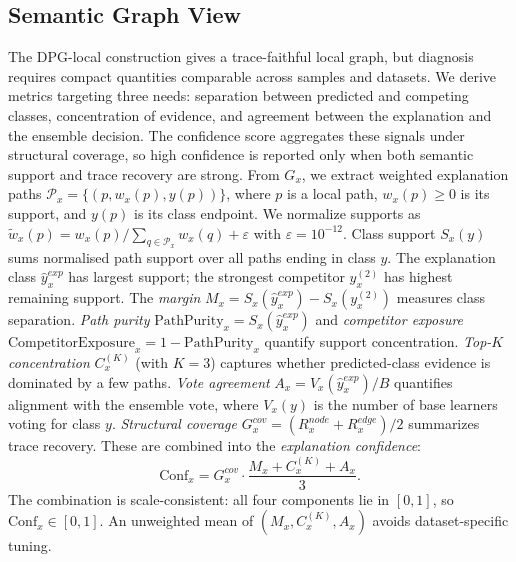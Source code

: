\documentclass[runningheads]{llncs}
\begin{document}
\subsection{Semantic Graph View} \label{sec:semantic-layer}
The DPG-local construction gives a trace-faithful local graph, but diagnosis requires compact quantities comparable across samples and datasets. We derive metrics targeting three needs: separation between predicted and competing classes, concentration of evidence, and agreement between the explanation and the ensemble decision. The confidence score aggregates these signals under structural coverage, so high confidence is reported only when both semantic support and trace recovery are strong.
From $G_x$, we extract weighted explanation paths $\mathcal{P}_x=\{(p,w_x(p),y(p))\}$, where $p$ is a local path, $w_x(p)\ge 0$ is its support, and $y(p)$ is its class endpoint. We normalize supports as $\tilde{w}_x(p)={w_x(p)}/{\sum_{q\in\mathcal{P}_x} w_x(q)+\varepsilon}$ with $\varepsilon=10^{-12}$. Class support $S_x(y)$ sums normalised path support over all paths ending in class $y$. The explanation class $\hat{y}^{exp}_x$ has largest support; the strongest competitor $y_x^{(2)}$ has highest remaining support.
The \emph{margin} $M_x=S_x(\hat{y}^{exp}_x)-S_x(y_x^{(2)})$ measures class separation. \emph{Path purity} $\mathrm{PathPurity}_x=S_x(\hat{y}^{exp}_x)$ and \emph{competitor exposure} $\mathrm{CompetitorExposure}_x=1-\mathrm{PathPurity}_x$ quantify support concentration.
\emph{Top-$K$ concentration} $C_x^{(K)}$ (with $K=3$) captures whether predicted-class evidence is dominated by a few paths. \emph{Vote agreement} $A_x=V_x(\hat{y}^{exp}_x)/B$ quantifies alignment with the ensemble vote, where $V_x(y)$ is the number of base learners voting for class $y$. \emph{Structural coverage} $G_x^{cov}=(R_x^{node}+R_x^{edge})/2$ summarizes trace recovery.
These are combined into the \emph{explanation confidence}:
\[
\mathrm{Conf}_x=G_x^{cov}\cdot\frac{M_x+C_x^{(K)}+A_x}{3}.
\]
The combination is scale-consistent: all four components lie in $[0,1]$, so $\mathrm{Conf}_x\in[0,1]$.
An unweighted mean of $(M_x,C_x^{(K)},A_x)$ avoids dataset-specific tuning.
\end{document}
